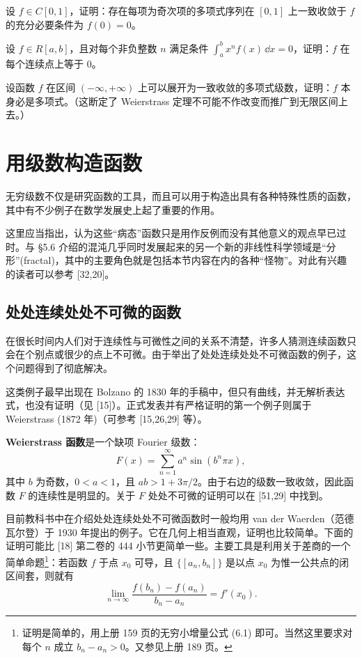 \begin{xexercise}[6]
设 $f\in C[0,1]$，证明：存在每项为奇次项的多项式序列在 $[0,1]$ 上一致收敛于 $f$ 的充分必要条件为 $f(0)=0$。
\end{xexercise}

\begin{xexercise}[7]
设 $f\in R[a,b]$，且对每个非负整数 $n$ 满足条件 $\int_a^b x^nf(x)\,\dd x=0$，证明：$f$ 在每个连续点上等于 0。
\end{xexercise}

\begin{xexercise}[8]
设函数 $f$ 在区间 $(-\infty,+\infty)$ 上可以展开为一致收敛的多项式级数，证明：$f$ 本身必是多项式。（这断定了 Weierstrass 定理不可能不作改变而推广到无限区间上去。）
\end{xexercise}

\section{用级数构造函数}

无穷级数不仅是研究函数的工具，而且可以用于构造出具有各种特殊性质的函数，其中有不少例子在数学发展史上起了重要的作用。

这里应当指出，认为这些“病态”函数只是用作反例而没有其他意义的观点早已过时。与 §5.6 介绍的混沌几乎同时发展起来的另一个新的非线性科学领域是“分形”(fractal)，其中的主要角色就是包括本节内容在内的各种“怪物”。对此有兴趣的读者可以参考 [32,20]。

\subsection{处处连续处处不可微的函数}

在很长时间内人们对于连续性与可微性之间的关系不清楚，许多人猜测连续函数只会在个别点或很少的点上不可微。由于举出了处处连续处处不可微函数的例子，这个问题得到了彻底解决。

这类例子最早出现在 Bolzano 的 1830 年的手稿中，但只有曲线，并无解析表达式，也没有证明（见 [15]）。正式发表并有严格证明的第一个例子则属于 Weierstrass (1872 年)（可参考 [15,26,29] 等）。

\textbf{Weierstrass 函数}是一个缺项 Fourier 级数：
\[
  F(x)=\sum_{n=1}^{\infty}a^n\sin(b^n\pi x),
\]
其中 $b$ 为奇数，$0<a<1$，且 $ab>1+3\pi/2$。由于右边的级数一致收敛，因此函数 $F$ 的连续性是明显的。关于 $F$ 处处不可微的证明可以在 [51,29] 中找到。

目前教科书中在介绍处处连续处处不可微函数时一般均用 van der Waerden（范德瓦尔登）于 1930 年提出的例子。它在几何上相当直观，证明也比较简单。下面的证明可能比 [18] 第二卷的 444 小节更简单一些。主要工具是利用关于差商的一个简单命题\footnote{证明是简单的，用上册 159 页的无穷小增量公式 (6.1) 即可。当然这里要求对每个 $n$ 成立 $b_n-a_n>0$。又参见上册 189 页。}：若函数 $f$ 于点 $x_0$ 可导，且 $\{[a_n,b_n]\}$ 是以点 $x_0$ 为惟一公共点的闭区间套，则就有
\begin{equation}
  \lim_{n\to\infty}\frac{f(b_n)-f(a_n)}{b_n-a_n}=f'(x_0).
\tag{16.24}
\label{eq:16.24}
\end{equation}

